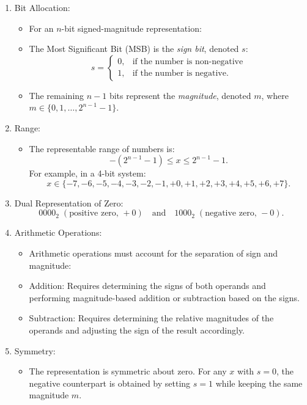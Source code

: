 \begin{enumerate}[left=1cm]
    \item Bit Allocation:
    \begin{itemize}
        \item For an \( n \)-bit signed-magnitude representation:
        \item The Most Significant Bit (MSB) is the \textit{sign bit}, denoted \( s \):
       \[
       s = 
       \begin{cases} 
       0, & \text{if the number is non-negative} \\
       1, & \text{if the number is negative.}
       \end{cases}
       \]
        \item The remaining \( n-1 \) bits represent the \textit{magnitude}, denoted \( m \), where \( m \in \{0, 1, \dots, 2^{n-1} - 1\} \).
    \end{itemize}

    \item Range:
    \begin{itemize}
        \item The representable range of numbers is:
     \[
     -\left(2^{n-1} - 1\right) \leq x \leq 2^{n-1} - 1.
     \]
     For example, in a 4-bit system:
     \[
     x \in \{-7, -6, -5, -4, -3, -2, -1, +0, +1, +2, +3, +4, +5, +6, +7\}.
     \]
     \end{itemize}

    \item Dual Representation of Zero:
     \[
     0000_2 \; (\text{positive zero, } +0) \quad \text{and} \quad 1000_2 \; (\text{negative zero, } -0).
     \]

     \item Arithmetic Operations:
     \begin{itemize}
        \item Arithmetic operations must account for the separation of sign and magnitude:
        \item Addition: Requires determining the signs of both operands and performing magnitude-based addition or subtraction based on the signs.
        \item Subtraction: Requires determining the relative magnitudes of the operands and adjusting the sign of the result accordingly.
    \end{itemize}

    \item Symmetry:
    \begin{itemize}
        \item The representation is symmetric about zero. For any \( x \) with \( s = 0 \), the negative counterpart is obtained by setting \( s = 1 \) while keeping the same magnitude \( m \).
    \end{itemize}


\end{enumerate}
